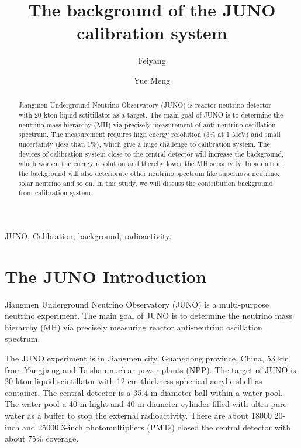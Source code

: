 \documentclass[review,number,sort&compress]{elsarticle}
\begin{document}
\begin{frontmatter}

\title{The background of the JUNO calibration system }

\author{Feiyang}
\author{Yue Meng }
\address{Shanghai Key Laboratory for Particle Physics and Cosmology, Institute of Nuclear and Particle Physics (INPAC) and School of Physics and Astronomy, Shanghai Jiao Tong University, Shanghai 200240, China}
\begin{abstract}
Jiangmen Underground Neutrino Observatory (JUNO) is reactor neutrino detector with 20 kton liquid sctitillator as a target. The main goal of JUNO is to determine the neutrino mass hierarchy (MH) via precisely measurement of anti-neutrino oscillation spectrum. The measurement requires high energy resolution (3\% at 1 MeV) and small uncertainty (less than 1\%), which give a huge challenge to calibration system. The devices of calibration system close to the central detector will increase the background, which worsen the energy resolution and thereby lower the MH sensitivity. In addiction, the background will also deteriorate other neutrino spectrum like supernova neutrino, solar neutrino and so on. In this study, we will discuss the contribution background from calibration system. 
\end{abstract}

\begin{keyword}
JUNO, Calibration, background, radioactivity.
\end{keyword}
\end{frontmatter}
\linenumbers
\section{The JUNO Introduction}
Jiangmen Underground Neutrino Observatory (JUNO) is a multi-purpose neutrino experiment. 
The main goal of JUNO is to determine the neutrino mass hierarchy (MH) via precisely measuring reactor anti-neutrino oscillation spectrum. 

The JUNO experiment is in Jiangmen city, Guangdong province, China, 53 km from Yangjiang and Taishan nuclear power plants (NPP).
The target of JUNO is 20 kton liquid scintillator with 12 cm thickness spherical acrylic shell as container.
The central detector is a 35.4 m diameter ball within a water pool.
The water pool a 40 m hight and 40 m diameter cylinder filled with ultra-pure water as a buffer to stop the external radioactivity. 
There are about 18000 20-inch and 25000 3-inch photomultipliers (PMTs) closed the central detector with about 75\% coverage.
\end{document}
